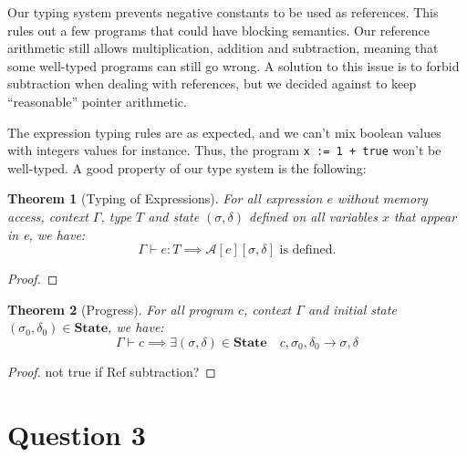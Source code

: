 \documentclass{article}
\newtheorem{thm}{Theorem}
\newcommand{\state}{\mathbf{State}}
\newcommand{\Aa}[2]{\mathcal{A}\left[#1\right]\left[#2\right]}
\begin{document}
Our typing system prevents negative constants to be used as references.
This rules out a few programs that could have blocking semantics.
Our reference arithmetic still allows multiplication, addition and subtraction, meaning that some well-typed programs can still go wrong.
A solution to this issue is to forbid subtraction when dealing with references, but we decided against to keep ``reasonable'' pointer arithmetic.

The expression typing rules are as expected, and we can't mix boolean values with integers values for instance. Thus, the program \texttt{x := 1 + true} won't be well-typed. A good property of our type system is the following:\\

\begin{thm}[Typing of Expressions]
For all expression $e$ without memory access, context $\Gamma$, type $T$ and state $(\sigma, \delta)$ defined on all variables $x$ that appear in e, we have:
\[
\Gamma\vdash e : T\implies \Aa{e}{\sigma,\delta}\text{ is defined}.
\]
\end{thm}

\begin{proof}
\end{proof}

\begin{thm}[Progress]
For all program $c$, context $\Gamma$ and initial state $(\sigma_0, \delta_0) \in \state{}$, we have:
\[
\Gamma \vdash c \implies \exists (\sigma, \delta) \in \state{} \quad c, \sigma_0, \delta_0 \longrightarrow \sigma, \delta
\]
\end{thm}

\begin{proof}
not true if Ref subtraction?
\end{proof}


\section*{Question 3}
\end{document}
